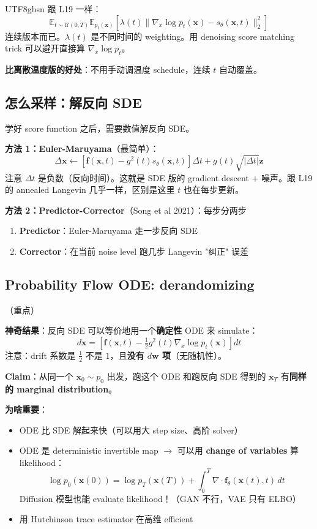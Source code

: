 \documentclass[11pt]{article}
\begin{document}
\begin{CJK}{UTF8}{gbsn}
跟 L19 一样：
\[
\mathbb{E}_{t \sim \mathcal{U}(0, T)} \mathbb{E}_{p_t(\mathbf{x})} \left[ \lambda(t) \| \nabla_x \log p_t(\mathbf{x}) - s_\theta(\mathbf{x}, t) \|_2^2 \right]
\]
连续版本而已。$\lambda(t)$ 是不同时间的 weighting。用 denoising score matching trick 可以避开直接算 $\nabla_x \log p_t$。

\textbf{比离散温度版的好处}：不用手动调温度 schedule，连续 $t$ 自动覆盖。

\subsection{怎么采样：解反向 SDE}

学好 score function 之后，需要数值解反向 SDE。

\textbf{方法 1：Euler-Maruyama}（最简单）：
\[
\Delta \mathbf{x} \leftarrow [\mathbf{f}(\mathbf{x}, t) - g^2(t) s_\theta(\mathbf{x}, t)] \Delta t + g(t) \sqrt{|\Delta t|} \mathbf{z}
\]
注意 $\Delta t$ 是负数（反向时间）。这就是 SDE 版的 gradient descent + 噪声。跟 L19 的 annealed Langevin 几乎一样，区别是这里 $t$ 也在每步更新。

\textbf{方法 2：Predictor-Corrector}（Song et al 2021）：每步分两步
\begin{enumerate}[nosep]
  \item \textbf{Predictor}：Euler-Maruyama 走一步反向 SDE
  \item \textbf{Corrector}：在当前 noise level 跑几步 Langevin "纠正" 误差
\end{enumerate}

\subsection{Probability Flow ODE: derandomizing} （重点）

\textbf{神奇结果}：反向 SDE 可以等价地用一个\textbf{确定性} ODE 来 simulate：
\[
d\mathbf{x} = \left[\mathbf{f}(\mathbf{x}, t) - \tfrac{1}{2} g^2(t) \nabla_x \log p_t(\mathbf{x})\right] dt
\]
注意：drift 系数是 $\tfrac{1}{2}$ 不是 $1$，且\textbf{没有 $d\mathbf{w}$ 项}（无随机性）。

\textbf{Claim}：从同一个 $\mathbf{x}_0 \sim p_0$ 出发，跑这个 ODE 和跑反向 SDE 得到的 $\mathbf{x}_T$ 有\textbf{同样的 marginal distribution}。

\textbf{为啥重要}：
\begin{itemize}[nosep]
  \item ODE 比 SDE 解起来快（可以用大 step size、高阶 solver）
  \item ODE 是 deterministic invertible map $\to$ 可以用 \textbf{change of variables} 算 likelihood：
    \[
    \log p_0(\mathbf{x}(0)) = \log p_T(\mathbf{x}(T)) + \int_0^T \nabla \cdot \mathbf{f}_\theta(\mathbf{x}(t), t) \, dt
    \]
    Diffusion 模型也能 evaluate likelihood！（GAN 不行，VAE 只有 ELBO）
  \item 用 Hutchinson trace estimator 在高维 efficient
\end{itemize}


\end{CJK}
\end{document}
